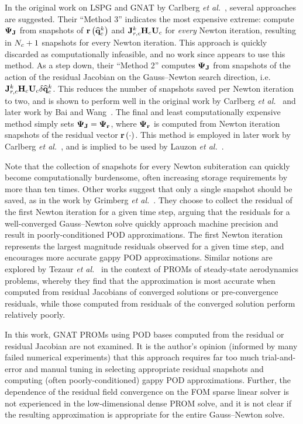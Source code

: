 In the original work on LSPG and GNAT by Carlberg \textit{et al.}~\cite{Carlberg2010}, several approaches are suggested. Their ``Method 3'' indicates the most expensive extreme: compute $\deimBasisJacob$ from snapshots of $\mathbf{r}\left(\mathbf{\widehat{q}}_{c}^{k}\right)$ and $\jacobResCons^{\newtonIdx} \consScale \consTrial$ for \textit{every} Newton iteration, resulting in $N_c + 1$ snapshots for every Newton iteration. This approach is quickly discarded as computationally infeasible, and no work since appears to use this method. As a step down, their ``Method 2'' computes $\deimBasisJacob$ from snapshots of the action of the residual Jacobian on the Gauss--Newton search direction, i.e. $\jacobResCons^{\newtonIdx} \consScale \consTrial \delta \consVecCoef^{\newtonIdx}$. This reduces the number of snapshots saved per Newton iteration to two, and is shown to perform well in the original work by Carlberg \textit{et al.}~\cite{Carlberg2010} and later work by Bai and Wang~\cite{Bai2022}. The final and least computationally expensive method simply sets $\deimBasisJacob = \deimBasisRes$, where $\deimBasisRes$ is computed from Newton iteration snapshots of the residual vector $\mathbf{r}\left(\cdot\right)$. This method is employed in later work by Carlberg \textit{et al.}~\cite{Carlberg2013,Carlberg2017}, and is implied to be used by Lauzon \textit{et al.}~\cite{Lauzon2022}.

Note that the collection of snapshots for every Newton subiteration can quickly become computationally burdensome, often increasing storage requirements by more than ten times. Other works suggest that only a single snapshot should be saved, as in the work by Grimberg \textit{et al.}~\cite{Grimberg2021}. They choose to collect the residual of the first Newton iteration for a given time step, arguing that the residuals for a well-converged Gauss--Newton solve quickly approach machine precision and result in poorly-conditioned POD approximations. The first Newton iteration represents the largest magnitude residuals observed for a given time step, and encourages more accurate gappy POD approximations. Similar notions are explored by Tezaur \textit{et al.}~\cite{Tezaur2022} in the context of PROMs of steady-state aerodynamics problems, whereby they find that the approximation is most accurate when computed from residual Jacobians of converged solutions or pre-convergence residuals, while those computed from residuals of the converged solution perform relatively poorly.

In this work, GNAT PROMs using POD bases computed from the residual or residual Jacobian are not examined. It is the author's opinion (informed by many failed numerical experiments) that this approach requires far too much trial-and-error and manual tuning in selecting appropriate residual snapshots and computing (often poorly-conditioned) gappy POD approximations. Further, the dependence of the residual field convergence on the FOM sparse linear solver is not experienced in the low-dimensional dense PROM solve, and it is not clear if the resulting approximation is appropriate for the entire Gauss--Newton solve.


